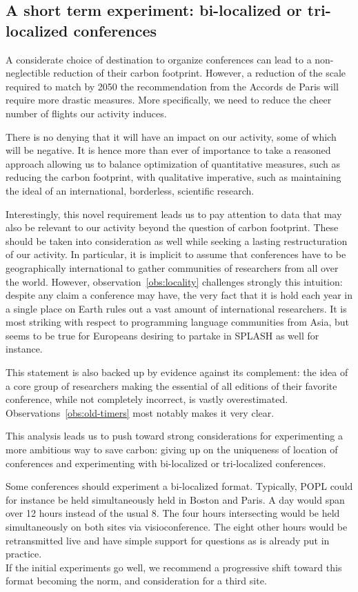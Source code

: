 \subsection{A short term experiment: bi-localized or tri-localized conferences}

A considerate choice of destination to organize conferences can lead to a
non-neglectible reduction of their carbon footprint. However, a reduction of
the scale required to match by 2050 the recommendation from the Accords de Paris
will require more drastic measures. More specifically, we need to reduce the cheer
number of flights our activity induces.

There is no denying that it will have an impact on our activity, some of which will
be negative. It is hence more than ever of importance to take a reasoned approach
allowing us to balance optimization of quantitative measures, such as reducing the
carbon footprint, with qualitative imperative, such as maintaining the ideal of
an international, borderless, scientific research.

Interestingly, this novel requirement leads us to pay attention to data that may also be
relevant to our activity beyond the question of carbon footprint. These should be
taken into consideration as well while seeking a lasting restructuration of our
activity. In particular, it is implicit to assume that conferences have to be
geographically international to gather communities of researchers from all over the
world. However, observation~\ref{obs:locality} challenges strongly this intuition:
despite any claim a conference may have, the very fact that it is hold each year in
a single place on Earth rules out a vast amount of international researchers. It is most
striking with respect to programming language communities from Asia, but seems to be
true for Europeans desiring to partake in SPLASH as well for instance.

This statement is also backed up by evidence against its complement: the idea of a core
group of researchers making the essential of all editions of their favorite conference,
while not completely incorrect, is vastly overestimated. Observations~\ref{obs:old-timers}
most notably makes it very clear.

This analysis leads us to push toward strong considerations for experimenting a more
ambitious way to save carbon: giving up on the uniqueness of location of conferences and
experimenting with bi-localized or tri-localized conferences.

\begin{recommend}
  Some conferences should experiment a bi-localized format. Typically, POPL could for
  instance be held simultaneously held in Boston and Paris. A day would span over 12 hours
  instead of the usual 8. The four hours intersecting would be held simultaneously on
  both sites via visioconference. The eight other hours would be retransmitted live and
  have simple support for questions as is already put in practice.\\
  If the initial experiments go well, we recommend a progressive shift toward this
  format becoming the norm, and consideration for a third site.
\end{recommend}

